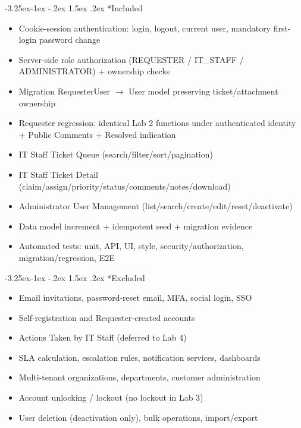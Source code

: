 \documentclass[11pt,a4paper]{article}
\makeatletter
\renewcommand\paragraph{\@startsection{paragraph}{4}{\z@}%
  {-3.25ex\@plus -1ex \@minus -.2ex}%
  {1.5ex \@plus .2ex}%
  {\normalfont\normalsize\bfseries}}
\makeatother
\begin{document}
\paragraph*{Included}
\begin{itemize}
\item Cookie-session authentication: login, logout, current user, mandatory first-login password change
\item Server-side role authorization (REQUESTER / IT\_STAFF / ADMINISTRATOR) + ownership checks
\item Migration RequesterUser $\to$ User model preserving ticket/attachment ownership
\item Requester regression: identical Lab 2 functions under authenticated identity + Public Comments + Resolved indication
\item IT Staff Ticket Queue (search/filter/sort/pagination)
\item IT Staff Ticket Detail (claim/assign/priority/status/comments/notes/download)
\item Administrator User Management (list/search/create/edit/reset/deactivate)
\item Data model increment + idempotent seed + migration evidence
\item Automated tests: unit, API, UI, style, security/authorization, migration/regression, E2E
\end{itemize}

\paragraph*{Excluded}
\begin{itemize}
\item Email invitations, password-reset email, MFA, social login, SSO
\item Self-registration and Requester-created accounts
\item Actions Taken by IT Staff (deferred to Lab 4)
\item SLA calculation, escalation rules, notification services, dashboards
\item Multi-tenant organizations, departments, customer administration
\item Account unlocking / lockout (no lockout in Lab 3)
\item User deletion (deactivation only), bulk operations, import/export
\end{itemize}
\end{document}
